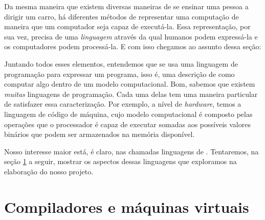 
  Da mesma maneira que existem diversas maneiras de se ensinar uma pessoa a
  dirigir um carro, há diferentes métodos de representar uma computação de
  maneira que um computador seja capaz de executá-la. Essa representação, por
  sua vez, precisa de uma \emph{linguagem} através da qual humanos podem
  expressá-la e os computadores podem processá-la. E com isso chegamos ao
  assunto dessa seção:





  Juntando todos esses elementos, entendemos que se usa uma linguagem de
  programação para expressar um programa, isso é, uma descrição de como computar
  algo dentro de um modelo computacional. Bom, sabemos que existem \emph{muitas}
  linguagens de programação. Cada uma delas tem uma maneira particular de
  satisfazer essa caracterização. Por exemplo, a nível de \emph{hardware}, temos
  a linguagem de código de máquina, cujo modelo computacional é composto pelas
  operações que o processador é capaz de executar somadas aos possíveis valores
  binários que podem ser armazenados na memória disponível.

  Nosso interesse maior está, é claro, nas chamadas linguagens de \script{}.
  Tentaremos, na seção \ref{cap:conceitos:compiladores} a seguir, mostrar os
  aspectos dessas linguagens que exploramos na elaboração do nosso projeto.

  \section{Compiladores e máquinas virtuais}
  \label{cap:conceitos:compiladores}

